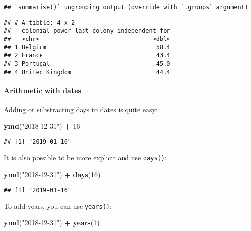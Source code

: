 \documentclass[
]{article}
\newenvironment{Shaded}{\begin{snugshade}}{\end{snugshade}}
\newcommand{\DecValTok}[1]{\textcolor[rgb]{0.00,0.00,0.81}{#1}}
\newcommand{\KeywordTok}[1]{\textcolor[rgb]{0.13,0.29,0.53}{\textbf{#1}}}
\newcommand{\NormalTok}[1]{#1}
\newcommand{\OperatorTok}[1]{\textcolor[rgb]{0.81,0.36,0.00}{\textbf{#1}}}
\newcommand{\StringTok}[1]{\textcolor[rgb]{0.31,0.60,0.02}{#1}}
\begin{document}
\begin{verbatim}
## `summarise()` ungrouping output (override with `.groups` argument)
\end{verbatim}

\begin{verbatim}
## # A tibble: 4 x 2
##   colonial_power last_colony_independent_for
##   <chr>                                <dbl>
## 1 Belgium                               58.4
## 2 France                                43.4
## 3 Portugal                              45.0
## 4 United Kingdom                        44.4
\end{verbatim}

\hypertarget{arithmetic-with-dates}{%
\paragraph{Arithmetic with dates}\label{arithmetic-with-dates}}

Adding or substracting days to dates is quite easy:

\begin{Shaded}
\begin{Highlighting}[]
\KeywordTok{ymd}\NormalTok{(}\StringTok{"2018{-}12{-}31"}\NormalTok{) }\OperatorTok{+}\StringTok{ }\DecValTok{16}
\end{Highlighting}
\end{Shaded}

\begin{verbatim}
## [1] "2019-01-16"
\end{verbatim}

It is also possible to be more explicit and use \texttt{days()}:

\begin{Shaded}
\begin{Highlighting}[]
\KeywordTok{ymd}\NormalTok{(}\StringTok{"2018{-}12{-}31"}\NormalTok{) }\OperatorTok{+}\StringTok{ }\KeywordTok{days}\NormalTok{(}\DecValTok{16}\NormalTok{)}
\end{Highlighting}
\end{Shaded}

\begin{verbatim}
## [1] "2019-01-16"
\end{verbatim}

To add years, you can use \texttt{years()}:

\begin{Shaded}
\begin{Highlighting}[]
\KeywordTok{ymd}\NormalTok{(}\StringTok{"2018{-}12{-}31"}\NormalTok{) }\OperatorTok{+}\StringTok{ }\KeywordTok{years}\NormalTok{(}\DecValTok{1}\NormalTok{)}
\end{Highlighting}
\end{Shaded}
\end{document}
